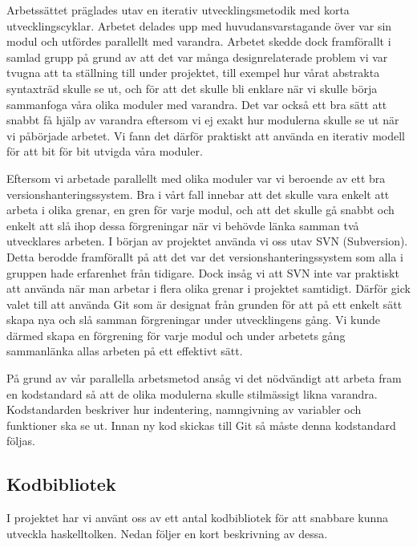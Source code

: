Arbetssättet präglades utav en iterativ utvecklingsmetodik med korta utvecklingscyklar. Arbetet delades upp med huvudansvarstagande över var sin modul och utfördes parallellt med varandra. Arbetet skedde dock framförallt i samlad grupp på grund av att det var många designrelaterade problem vi var tvugna att ta ställning till under projektet, till exempel hur vårat abstrakta syntaxträd skulle se ut, och för att det skulle bli enklare när vi skulle börja sammanfoga våra olika moduler med varandra. 
Det var också ett bra sätt att snabbt få hjälp av varandra eftersom vi ej exakt hur modulerna skulle se ut när vi påbörjade arbetet. Vi fann det därför praktiskt att använda en iterativ modell för att bit för bit utvigda våra moduler. 

Eftersom vi arbetade parallellt med olika moduler var vi beroende av ett bra versionshanteringssystem. Bra i vårt fall innebar att det skulle vara enkelt att arbeta i olika grenar, en gren för varje modul, och att det skulle gå snabbt och enkelt att slå ihop dessa förgreningar när vi behövde länka samman två utvecklares arbeten. I början av projektet använda vi oss utav SVN (Subversion). Detta berodde framförallt på att det var det versionshanteringssystem som alla i gruppen hade erfarenhet från tidigare. Dock insåg vi att SVN inte var praktiskt att använda när man arbetar i flera olika grenar i projektet samtidigt. Därför gick valet till att använda Git som är designat från grunden för att på ett enkelt sätt skapa nya och slå samman förgreningar under utvecklingens gång. Vi kunde därmed skapa en förgrening för varje modul och under arbetets gång sammanlänka allas arbeten på ett effektivt sätt. 

På grund av vår parallella arbetsmetod ansåg vi det nödvändigt att arbeta fram en kodstandard så att de olika modulerna skulle stilmässigt likna varandra. Kodstandarden beskriver hur indentering, namngivning av variabler och funktioner ska se ut. Innan ny kod skickas till Git så måste denna kodstandard följas.  


\subsection{Kodbibliotek}
I projektet har vi använt oss av ett antal kodbibliotek för att snabbare kunna utveckla haskelltolken. Nedan följer en kort beskrivning av dessa.

